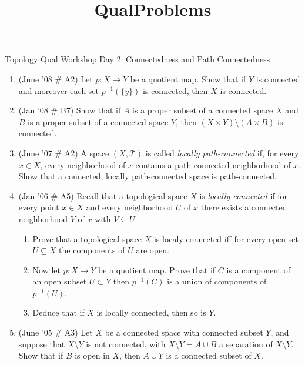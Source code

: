 \documentclass[psamsfonts, 11pt, reqno]{amsart}
\title{QualProblems}
\begin{document}
\begin{center}
\begin{large}
Topology Qual Workshop Day 2: Connectedness and Path Connectedness
\end{large}
\end{center}
\vspace{.25in}

\begin{enumerate}
\item (June '08 \# A2) Let $p: X \rightarrow Y$ be a quotient map.  Show that if $Y$ is connected and moreover each set $p^{-1}(\{y\})$
is connected, then $X$ is connected.

\vfill

\item (Jan '08 \# B7) Show that if $A$ is a proper subset of a connected space $X$ and $B$ is a proper subset of a connected space $Y$,
then $(X \times Y) \setminus (A \times B)$ is connected.

\vfill

\item (June '07 \# A2) A space $(X, \mathcal{T})$ is called \emph{locally path-connected} if, for every $x \in X$, every neighborhood
of $x$ contains a path-connected neighborhood of $x$.  Show that a connected, locally path-connected space is path-connected.

\vfill

\item (Jan '06 \# A5) Recall that a topological space $X$ is \emph{locally connected} if for every point $x \in X$ and every
neighborhood $U$ of $x$ there exists a connected neighborhood $V$ of $x$ with $V \subseteq U$.
\begin{enumerate}
\item Prove that a topological space $X$ is localy connected iff for every open set $U\subseteq X$ the components of $U$ are open.
\item Now let $p: X \rightarrow Y$ be a quotient map.  Prove that if $C$ is a component of an open subset $U\subset Y$
then $p^{-1}(C)$ is a union of components of $p^{-1}(U)$.
\item Deduce that if $X$ is locally connected, then so is $Y$.
\end{enumerate}

\vfill

\item (June '05 \# A3) Let $X$ be a connected space with connected subset $Y$, and suppose that $X \setminus Y$ is not connected,
with $X \setminus Y = A \cup B$ a separation of $X \setminus Y$.  Show that if $B$ is open in $X$, then $A \cup Y$ is a connected
subset of $X$.


\end{enumerate}
\end{document}
